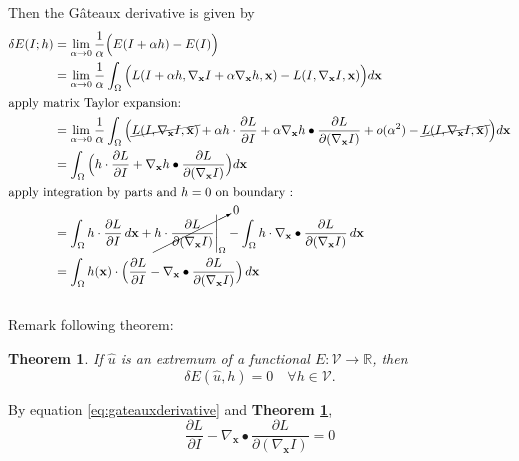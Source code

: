 \documentclass[paper=a4, fontsize=11pt]{scrartcl} %
\numberwithin{equation}{section} %
\numberwithin{figure}{section} %
\numberwithin{table}{section} %
\renewcommand{\vec}[1]{\mathbf{#1}}
\newtheorem{theorem}{Theorem}
\begin{document}
Then the G\^ateaux derivative is given by 
\begin{align}
	\delta E(I;h) &= \lim_{\alpha \to 0} \frac{1}{\alpha}\Big(E(I + \alpha h) - E(I)\Big) \\
	&= \lim_{\alpha \to 0} \frac{1}{\alpha} \int_\Omega \Big(L(I + \alpha h, \nabla_{\vec{x}} I + \alpha \nabla_{\vec{x}} h, \vec{x}) - L(I, \nabla_{\vec{x}} I, \vec{x}) \Big) d\vec{x} \\ 
	\shortintertext{apply matrix Taylor expansion:} 
	&= \lim_{\alpha \to 0} \frac{1}{\alpha} \int_\Omega \Big( \cancel{L(I, \nabla_{\vec{x}} I, \vec{x})} + \alpha h \cdot \frac{\partial L}{\partial I} + \alpha \nabla_{\vec{x}} h \bullet \frac{\partial L}{\partial (\nabla_{\vec{x}} I)} + o(\alpha^2) - \cancel{L(I, \nabla_{\vec{x}} I, \vec{x})} \Big) d\vec{x} \\
	&= \int_\Omega \Big( h \cdot \frac{\partial L}{\partial I} + \nabla_{\vec{x}} h \bullet \frac{\partial L}{\partial (\nabla_{\vec{x}} I)} \Big) d\vec{x} \\
	\shortintertext{apply integration by parts and $h = 0$ on boundary :} 
	&= \int_\Omega h \cdot \frac{\partial L}{\partial I} \, d\vec{x} + \cancelto{0}{h \cdot \frac{\partial L}{\partial (\nabla_{\vec{x}} I)} \Bigg|_\Omega}  - \int_\Omega h \cdot \nabla_{\vec{x}} \bullet \frac{\partial L}{\partial (\nabla_{\vec{x}} I)} \, d\vec{x} \\
	&= \int_\Omega h(\vec{x}) \cdot \Big( \frac{\partial L}{\partial I} - \nabla_{\vec{x}} \bullet \frac{\partial L}{\partial (\nabla_{\vec{x}} I)} \Big) \, d\vec{x} \label{eq:gateauxderivative} 
\end{align} \\

Remark following theorem:

\begin{theorem} \label{thm:thm1}
	If $\hat{u}$ is an extremum of a functional $E : \mathcal{V} \rightarrow \mathbb{R}$, then \\
	\begin{equation*}
		\delta E(\hat{u}, h) = 0 \quad \forall h \in \mathcal{V}.
	\end{equation*} 
\end{theorem}

By equation \ref{eq:gateauxderivative} and \textbf{Theorem \ref{thm:thm1}}, 
\begin{equation} \label{eq:eulereq}
	\frac{\partial L}{\partial I} - \nabla_{\vec{x}} \bullet \frac{\partial L}{\partial (\nabla_{\vec{x}} I)} = 0	
\end{equation}
\end{document}
